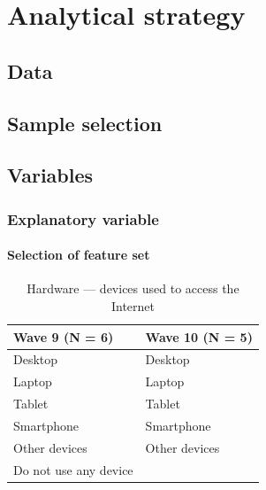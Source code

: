 \chapter{\label{ch:4-strategy}Analytical strategy}

\section{Data}

\section{Sample selection}\label{app:imaging}


\section{Variables}\label{sub:diagnostic}

\subsection{Explanatory variable}


\subsubsection{Selection of feature set}

\begin{table}[h!]
    \centering
    \caption{Hardware --- devices used to access the Internet}
    \label{tab:hardware}
    \begin{tabular}{ll}
        \toprule
        Wave 9 (N = 6) & Wave 10 (N = 5) \\
        \midrule
        Desktop & Desktop \\
        Laptop & Laptop \\
        Tablet & Tablet \\
        Smartphone & Smartphone \\
        Other devices & Other devices \\
        Do not use any device & \\
        \bottomrule
    \end{tabular}
\end{table}


